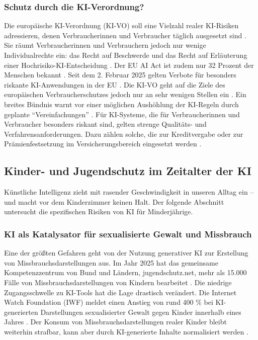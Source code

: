 \documentclass[12pt,a4paper]{article}
\begin{document}
	\subsubsection{Schutz durch die KI-Verordnung?}
	
	Die europäische KI-Verordnung (KI-VO) soll eine Vielzahl realer KI-Risiken adressieren, denen Verbraucherinnen und Verbraucher täglich ausgesetzt sind \cite{VZBV2025}. Sie räumt Verbraucherinnen und Verbrauchern jedoch nur wenige Individualrechte ein: das Recht auf Beschwerde und das Recht auf Erläuterung einer Hochrisiko-KI-Entscheidung \cite{VZBV2025}. Der EU AI Act ist zudem nur 32 Prozent der Menschen bekannt \cite{TUEV2025}. Seit dem 2. Februar 2025 gelten Verbote für besonders riskante KI-Anwendungen in der EU \cite{Rechtsanwalt2025}. Die KI-VO geht auf die Ziele des europäischen Verbraucherschutzes jedoch nur an sehr wenigen Stellen ein \cite{CRonline2025}. Ein breites Bündnis warnt vor einer möglichen Aushöhlung der KI-Regeln durch geplante \enquote{Vereinfachungen} \cite{Netzpolitik2026}. Für KI-Systeme, die für Verbraucherinnen und Verbraucher besonders riskant sind, gelten strenge Qualitäts- und Verfahrensanforderungen. Dazu zählen solche, die zur Kreditvergabe oder zur Prämienfestsetzung im Versicherungsbereich eingesetzt werden \cite{BMJV2025}.
	
	\subsection{Kinder- und Jugendschutz im Zeitalter der KI}
	
	Künstliche Intelligenz zieht mit rasender Geschwindigkeit in unseren Alltag ein – und macht vor dem Kinderzimmer keinen Halt. Der folgende Abschnitt untersucht die spezifischen Risiken von KI für Minderjährige.
	
	\subsubsection{KI als Katalysator für sexualisierte Gewalt und Missbrauch}
	
	Eine der größten Gefahren geht von der Nutzung generativer KI zur Erstellung von Missbrauchsdarstellungen aus. Im Jahr 2025 hat das gemeinsame Kompetenzzentrum von Bund und Ländern, jugendschutz.net, mehr als 15.000 Fälle von Missbrauchsdarstellungen von Kindern bearbeitet \cite{jugendschutz2025}. Die niedrige Zugangsschwelle zu KI-Tools hat die Lage drastisch verändert. Die Internet Watch Foundation (IWF) meldet einen Anstieg von rund 400 \% bei KI-generierten Darstellungen sexualisierter Gewalt gegen Kinder innerhalb eines Jahres \cite{IWF2025}. Der Konsum von Missbrauchsdarstellungen realer Kinder bleibt weiterhin strafbar, kann aber durch KI-generierte Inhalte normalisiert werden \cite{BKA2025}.
	
\end{document}
